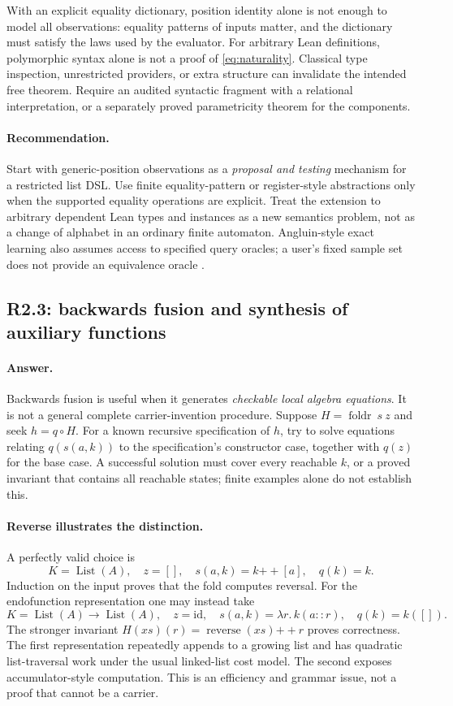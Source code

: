 \documentclass[11pt,a4paper]{article}
\newcommand{\code}[1]{\texttt{\detokenize{#1}}}
\newcommand{\foldr}{\operatorname{foldr}}
\newcommand{\answer}{\paragraph{Answer.}}
\newcommand{\recommend}{\paragraph{Recommendation.}}
\theoremstyle{definition}
\theoremstyle{remark}
\begin{document}
With an explicit equality dictionary, position identity alone is not enough to
model all observations: equality patterns of inputs matter, and the dictionary
must satisfy the laws used by the evaluator. For arbitrary Lean definitions,
polymorphic syntax alone is not a proof of \eqref{eq:naturality}. Classical type
inspection, unrestricted providers, or extra structure can invalidate the
intended free theorem. Require an audited syntactic fragment with a relational
interpretation, or a separately proved parametricity theorem for the components.

\recommend Start with generic-position observations as a \emph{proposal and
testing} mechanism for a restricted list DSL. Use finite equality-pattern or
register-style abstractions only when the supported equality operations are
explicit. Treat the extension to arbitrary dependent Lean types and instances
as a new semantics problem, not as a change of alphabet in an ordinary finite
automaton. Angluin-style exact learning also assumes access to specified query
oracles; a user's fixed sample set does not provide an equivalence oracle
\cite{angluin}.

\subsection{R2.3: backwards fusion and synthesis of auxiliary functions}
\answer Backwards fusion is useful when it generates \emph{checkable local
algebra equations}. It is not a general complete carrier-invention procedure.
Suppose $H=\foldr\ s\ z$ and seek $h=q\circ H$. For a known recursive
specification of $h$, try to solve equations relating $q(s(a,k))$ to the
specification's constructor case, together with $q(z)$ for the base case. A
successful solution must cover every reachable $k$, or a proved invariant that
contains all reachable states; finite examples alone do not establish this.

\paragraph{Reverse illustrates the distinction.}
A perfectly valid choice is
\[
 K=\operatorname{List}(A),\quad z=[],\quad
 s(a,k)=k\mathbin{++}[a],\quad q(k)=k.
\]
Induction on the input proves that the fold computes reversal. For the
endofunction representation one may instead take
\[
 K=\operatorname{List}(A)\to\operatorname{List}(A),\quad z=\mathrm{id},\quad
 s(a,k)=\lambda r.\,k(a::r),\quad q(k)=k([]).
\]
The stronger invariant $H(xs)(r)=\operatorname{reverse}(xs)\mathbin{++}r$
proves correctness. The first representation repeatedly appends to a growing
list and has quadratic list-traversal work under the usual linked-list cost
model. The second exposes accumulator-style computation. This is an efficiency
and grammar issue, not a proof that \code{List A} cannot be a carrier.
\end{document}
